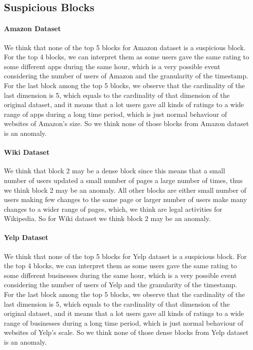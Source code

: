\subsection{Suspicious Blocks}
\paragraph{Amazon Dataset} We think that none of the top 5 blocks for Amazon dataset is a suspicious block. For the top 4 blocks, we can interpret them as some users gave the same rating to some different apps during the same hour, which is a
very possible event considering the number of users of Amazon and the granularity of the timestamp. For the last block among the top 5 blocks, we observe that the cardinality of the last dimension is 5, which equals to the cardinality of
that dimension of the original dataset, and it means that a lot users gave all kinds of ratings to a wide range of apps during a long time period, which is just normal behaviour of websites of Amazon's size.
So we think none of those blocks from Amazon dataset is an anomaly.
\paragraph{Wiki Dataset} We think that block 2 may be a dense block since this means that a small number of users updated a small number of pages a large number of times, thus we think block 2 may be an anomaly. All other blocks are either
small number of users making few changes to the same page or larger number of users make many changes to a wider range of pages, which, we think are legal activities for Wikipedia. So for Wiki dataset we think block 2 may be an anomaly.
\paragraph{Yelp Dataset} We think that none of the top 5 blocks for Yelp dataset is a suspicious block. For the top 4 blocks, we can interpret them as some users gave the same rating to some different businesses during the same hour, which is a
very possible event considering the number of users of Yelp and the granularity of the timestamp. For the last block among the top 5 blocks, we observe that the cardinality of the last dimension is 5, which equals to the cardinality of
that dimension of the original dataset, and it means that a lot users gave all kinds of ratings to a wide range of businesses during a long time period, which is just normal behaviour of websites of Yelp's scale.
So we think none of those dense blocks from Yelp dataset is an anomaly.
